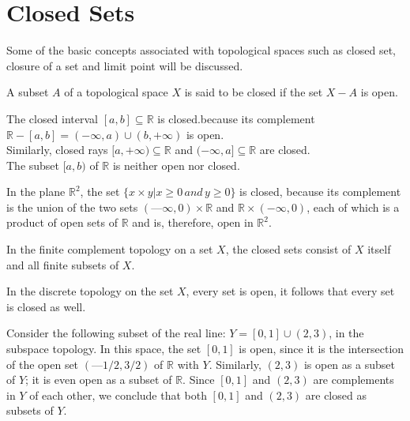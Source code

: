 \documentclass[a4paper,english,12pt]{article}
\begin{document}
\section{Closed Sets}
Some of the basic concepts associated with topological spaces such as closed set, closure of a set and limit point will be discussed.

\begin{defn}
	A subset $A$ of a topological space $X$ is said to be closed if the set $X - A$ is open.
\end{defn}
	
\begin{exmp}
	The closed interval $[a,b] \subseteq \mathbb{R}$ is closed.because its complement $\mathbb{R}-[a,b] = (-\infty,a) \cup (b,+\infty)$ is open.\\
	Similarly, closed rays $[a,+\infty) \subseteq \mathbb{R}$ and $(-\infty,a] \subseteq \mathbb{R}$ are closed.\\
	The subset $[a,b)$ of $\mathbb{R}$ is neither open nor closed.
\end{exmp}

\begin{exmp}
	In the plane $\mathbb{R}^2$, the set $\{x \times y | x \geq 0 \, and \, y \geq 0\}$ is closed, because its complement is the union of the two sets
	$(—\infty, 0) \times \mathbb{R}$ and $\mathbb{R} \times (-\infty,0)$,
	each of which is a product of open sets of $\mathbb{R}$ and is, therefore, open in $\mathbb{R}^2$.
\end{exmp}
	
	
\begin{exmp}
	In the finite complement topology on a set $X$, the closed sets consist of $X$ itself and all finite subsets of $X$.
\end{exmp}

\begin{exmp}
	In the discrete topology on the set $X$, every set is open, it follows that every set is closed as well.	
\end{exmp}

\begin{exmp}
	Consider the following subset of the real line:
	$Y=[0, 1]\cup(2,3)$,
	in the subspace topology. In this space, the set $[0, 1]$ is open, since it is the intersection of the open set $(—1/2, 3/2)$ of $\mathbb{R}$ with $Y$. Similarly, $(2, 3)$ is open as a subset of $Y$; it is even open
	as a subset of $\mathbb{R}$. Since $[0, 1]$ and $(2, 3)$ are complements in $Y$ of each other, we conclude that both $[0, 1]$ and $(2, 3)$ are closed as subsets of $Y$.
\end{exmp}
		
\end{document}
